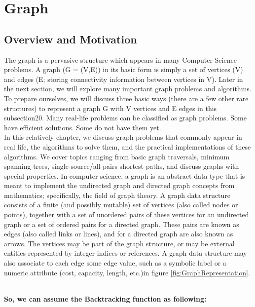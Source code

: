 \chapter{Graph}

\section{Overview and Motivation} 
\label{sec:s1}
   The graph is a pervasive structure which appears in many Computer Science problems. A graph (G = (V,E)) in its basic form is simply a set of vertices (V) and edges (E; storing connectivity information between vertices in V). Later in the next section, we will explore many important graph problems and algorithms. To prepare ourselves, we will discuss three basic ways (there are a few other rare structures) to represent a graph G with V vertices and E edges in this subsection20. Many real-life problems can be classified as graph problems. Some have efficient solutions. Some do not have them yet.   
   \\
   
   In this relatively chapter, we discuss graph problems that commonly appear in real life, the algorithms to solve them, and the practical implementations of these algorithms. We cover topics ranging from basic graph traversals, minimum spanning trees, single-source/all-pairs shortest paths, and discuss graphs with special properties. In computer science, a graph is an abstract data type that is meant to implement the undirected graph and directed graph concepts from mathematics; specifically, the field of graph theory. A graph data structure consists of a finite (and possibly mutable) set of vertices (also called nodes or points), together with a set of unordered pairs of these vertices for an undirected graph or a set of ordered pairs for a directed graph. These pairs are known as edges (also called links or lines), and for a directed graph are also known as arrows. The vertices may be part of the graph structure, or may be external entities represented by integer indices or references. A graph data structure may also associate to each edge some edge value, such as a symbolic label or a numeric attribute (cost, capacity, length, etc.)in figure \ref{fig:GraphRepresentation}.
\newpage

\\
\newline
\textbf{{\Large{So, we can assume the Backtracking function as following:}}}


